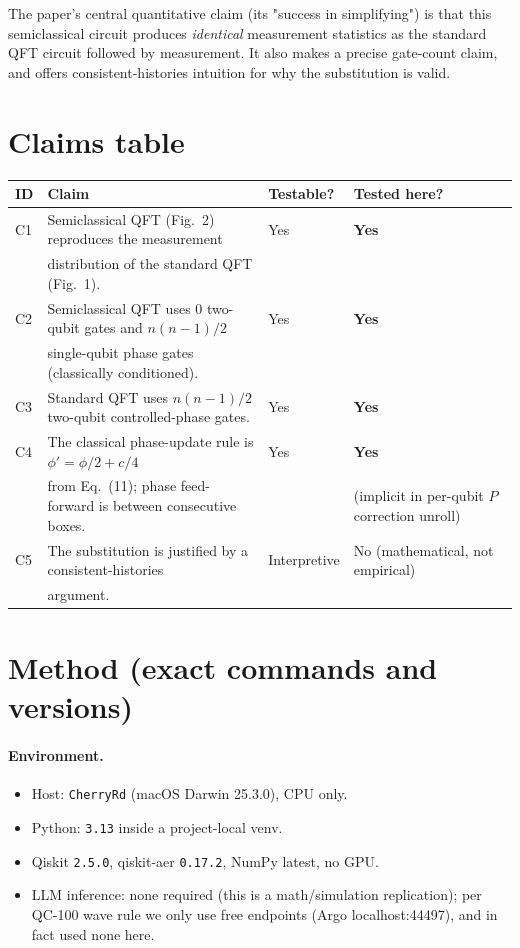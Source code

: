 \documentclass[11pt,letterpaper]{article}
\begin{document}
The paper's central quantitative claim (its "success in simplifying")
is that this semiclassical circuit produces \emph{identical}
measurement statistics as the standard QFT circuit followed by
measurement. It also makes a precise gate-count claim, and offers
consistent-histories intuition for why the substitution is valid.

\section{Claims table}

\begin{center}
\small
\begin{tabular}{@{}llll@{}}
\toprule
ID & Claim & Testable? & Tested here? \\
\midrule
C1 & Semiclassical QFT (Fig.~2) reproduces the measurement       & Yes & \textbf{Yes} \\
   & distribution of the standard QFT (Fig.~1). & & \\
C2 & Semiclassical QFT uses $0$ two-qubit gates and $n(n-1)/2$   & Yes & \textbf{Yes} \\
   & single-qubit phase gates (classically conditioned).        & & \\
C3 & Standard QFT uses $n(n-1)/2$ two-qubit controlled-phase gates. & Yes & \textbf{Yes} \\
C4 & The classical phase-update rule is $\phi'=\phi/2+c/4$      & Yes & \textbf{Yes} \\
   & from Eq.~(11); phase feed-forward is between consecutive boxes. & & (implicit in per-qubit $P$ correction unroll) \\
C5 & The substitution is justified by a consistent-histories    & Interpretive & No (mathematical, not empirical) \\
   & argument. & & \\
\bottomrule
\end{tabular}
\end{center}

\section{Method (exact commands and versions)}

\paragraph{Environment.}
\begin{itemize}
\item Host: \texttt{CherryRd} (macOS Darwin 25.3.0), CPU only.
\item Python: \texttt{3.13} inside a project-local venv.
\item Qiskit \texttt{2.5.0}, qiskit-aer \texttt{0.17.2}, NumPy latest, no GPU.
\item LLM inference: none required (this is a math/simulation replication);
      per QC-100 wave rule we only use free endpoints (Argo localhost:44497),
      and in fact used none here.
\end{itemize}
\end{document}
